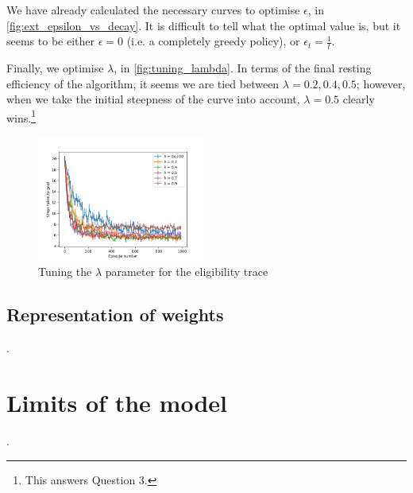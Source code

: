 \documentclass[a4paper, 11pt, twocolumn, final]{article} %
\begin{document}
We have already calculated the necessary curves to optimise $\epsilon$, in
\autoref{fig:ext_epsilon_vs_decay}.  It is difficult to tell what the optimal
value is, but it seems to be either $\epsilon = 0$ (i.e. a completely greedy
policy), or $\epsilon_t = \frac{1}{t}$.

Finally, we optimise $\lambda$, in \autoref{fig:tuning_lambda}.  In terms of the
final resting efficiency of the algorithm, it seems we are tied between $\lambda =
0.2, 0.4, 0.5$; however, when we take the initial steepness of the curve into
account, $\lambda = 0.5$ clearly wins.\footnote{This answers Question 3.}

\begin{figure}
  \includegraphics[width=0.49\textwidth]{figures/tuning_lambda.png}
  \caption{Tuning the $\lambda$ parameter for the eligibility trace}
  \label{fig:tuning_lambda}
\end{figure}

\subsection{Representation of weights} .

\section{Limits of the model} .




\onecolumn \appendix
\end{document}
